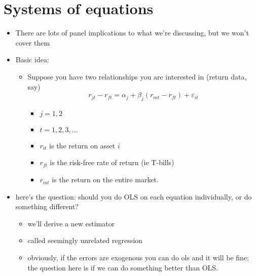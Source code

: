 

\part*{Systems of equations}%

\begin{itemize}
\item There are lots of panel implications to what we're discussing,
      but we won't cover them
\item Basic idea:
\begin{itemize}
\item Suppose you have two relationships you are interested in
        (return data, say)
        \[r_{jt} - r_{ft} = α_j + β_j (r_{mt} - r_{ft}) + ε_{it}\]
\begin{itemize}
\item $j = 1,2$
\item $t = 1,2,3,...$
\item $r_{it}$ is the return on asset $i$
\item $r_{ft}$ is the risk-free rate of return (ie T-bills)
\item $r_{mt}$ is the return on the entire market.
\end{itemize}
\end{itemize}
\item here's the question: should you do OLS on each equation
      individually, or do something different?
\begin{itemize}
\item we'll derive a new estimator
\item called seemingly unrelated regression
\item obviously, if the errors are exogenous you can do ols and it
        will be fine; the question here is if we can do something
        better than OLS.
\end{itemize}
\end{itemize}

